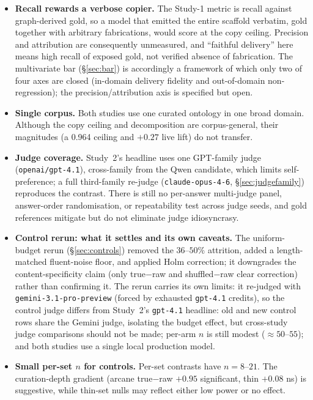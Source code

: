 \documentclass[10pt,twocolumn]{article}
\begin{document}
\begin{itemize}[topsep=2pt,itemsep=2pt,leftmargin=1.4em]
\item \textbf{Recall rewards a verbose copier.} The Study-1 metric is recall against graph-derived gold, so a model that emitted the entire scaffold verbatim, gold together with arbitrary fabrications, would score at the copy ceiling. Precision and attribution are consequently unmeasured, and ``faithful delivery'' here means high recall of exposed gold, not verified absence of fabrication. The multivariate bar (\S\ref{sec:bar}) is accordingly a framework of which only two of four axes are closed (in-domain delivery fidelity and out-of-domain non-regression); the precision/attribution axis is specified but open.
\item \textbf{Single corpus.} Both studies use one curated ontology in one broad domain. Although the copy ceiling and decomposition are corpus-general, their magnitudes (a 0.964 ceiling and $+0.27$ live lift) do not transfer.
\item \textbf{Judge coverage.} Study~2's headline uses one GPT-family judge
(\texttt{openai/gpt-4.1}), cross-family from the Qwen candidate, which limits self-preference; a full third-family re-judge (\texttt{claude-opus-4-6}, \S\ref{sec:judgefamily}) reproduces the contrast. There is still no per-answer multi-judge panel, answer-order randomisation, or repeatability test across judge seeds, and gold references mitigate but do not eliminate judge idiosyncrasy.
\item \textbf{Control rerun: what it settles and its own caveats.} The uniform-budget rerun (\S\ref{sec:controls}) removed the $36$--$50\%$ attrition, added a length-matched fluent-noise floor, and applied Holm correction; it downgrades the content-specificity claim (only true$-$raw and shuffled$-$raw clear correction) rather than confirming it. The rerun carries its own limits: it re-judged with \texttt{gemini-3.1-pro-preview} (forced by exhausted \texttt{gpt-4.1} credits), so the control judge differs from Study~2's \texttt{gpt-4.1} headline: old and new control rows share the Gemini judge, isolating the budget effect, but cross-study judge comparisons should not be made; per-arm $n$ is still modest ($\approx50$--$55$); and both studies use a single local production model.
\item \textbf{Small per-set $n$ for controls.} Per-set contrasts have $n=8$--$21$. The curation-depth gradient (arcane true$-$raw $+0.95$ significant, thin $+0.08$ ns) is suggestive, while thin-set nulls may reflect either low power or no effect.

\end{itemize}
\end{document}
